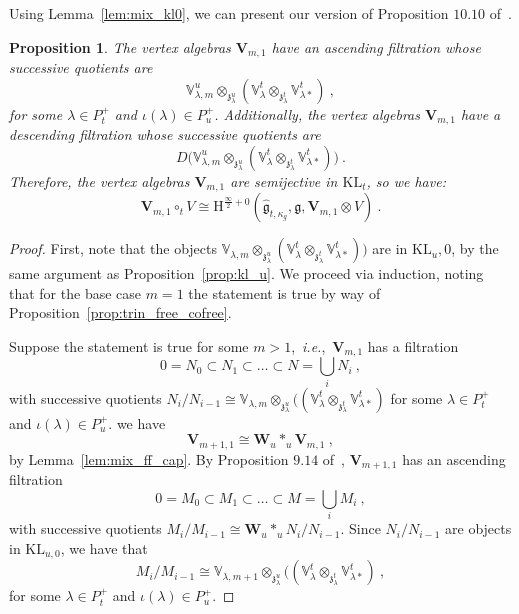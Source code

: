 \documentclass[a4paper]{article}
\newtheorem{prop}[thm]{Proposition}
\def\IV{\mathbb{V}}
\def\gf{\mathfrak{g}}
\def \zf{\mathfrak{z}}
\def \ie{{\it i.e.}}
\def \KL{\mathrm{KL}}
\newcommand{\Hi}[1]{\mathrm{H}^{\frac{\infty}{2}+#1}}
\def\W{\mathbf{W}}
\def\V{\mathbf{V}}
\begin{document}
Using Lemma~\ref{lem:mix_kl0}, we can present our version of Proposition $10.10$ of~\cite{Arakawa:2018egx}.
\begin{prop}\label{prop:mixed_free_cofree}
The vertex algebras $\V_{m,1}$ have an ascending filtration whose successive quotients are
\begin{equation*}
	\IV^u_{\lambda,m}\otimes_{\zf^u_{\lambda}}(\IV^t_{\lambda}\otimes_{\zf^t_\lambda}\IV^t_{\lambda*})~,
\end{equation*}
for some $\lambda\in P_t^+$ and $\iota(\lambda)\in P_u^+$. Additionally, the vertex algebras $\V_{m,1}$ have a descending filtration whose successive quotients are
\begin{equation*}
	D\big(\IV^u_{\lambda,m}\otimes_{\zf^u_{\lambda}}(\IV^t_{\lambda}\otimes_{\zf^t_\lambda}\IV^t_{\lambda*})\big)~.
\end{equation*}
Therefore, the vertex algebras $\V_{m,1}$ are semijective in $\KL_t$, so we have:
\begin{equation*}
	\V_{m,1}\circ_t V \cong \Hi{0}(\hat{\gf}_{t,\kappa_g},\gf,\V_{m,1}\otimes V)~.
\end{equation*}
\end{prop}
\begin{proof}
First, note that the objects $\IV_{\lambda,m}\otimes_{\zf^u_{\lambda}}(\IV^t_{\lambda}\otimes_{\zf^t_\lambda}\IV^t_{\lambda*})\big)$ are in $\KL_u,0$, by the same argument as Proposition~\ref{prop:kl_u}. We proceed via induction, noting that for the base case $m=1$ the statement is true by way of Proposition~\ref{prop:trin_free_cofree}.

Suppose the statement is true for some $m>1$,~\ie,~$\V_{m,1}$ has a filtration
\begin{equation*}
0=N_0\subset N_1\subset \dots \subset N=\bigcup_i N_i~,
\end{equation*}
with successive quotients $N_i/N_{i-1}\cong \IV_{\lambda,m}\otimes_{\zf^u_\lambda}((\IV^t_{\lambda}\otimes_{\zf^t_\lambda}\IV^t_{\lambda*})$ for some $\lambda\in P_t^+$ and $\iota(\lambda)\in P_u^+$.
we have
\begin{equation*}
	\V_{m+1,1} \cong \W_u\ast_u\V_{m,1}~,
\end{equation*}
by Lemma~\ref{lem:mix_ff_cap}. By Proposition $9.14$ of~\cite{Arakawa:2018egx}, $\V_{m+1,1}$ has an ascending filtration
\begin{equation*}
	0=M_0\subset M_1\subset\dots\subset M = \bigcup_i M_i ~,
\end{equation*}
with successive quotients $M_i/M_{i-1}\cong \W_u\ast_u N_i/N_{i-1}$. Since $N_i/N_{i-1}$ are objects in $\KL_{u,0}$, we have that
\begin{equation*}
	M_i/M_{i-1} \cong \IV_{\lambda,m+1}\otimes_{\zf^u_\lambda}((\IV^t_{\lambda}\otimes_{\zf^t_\lambda}\IV^t_{\lambda*})~,
\end{equation*}
for some $\lambda\in P_t^+$ and $\iota(\lambda)\in P_u^+$.
\end{proof}
\vspace{-6pt}
\end{document}
